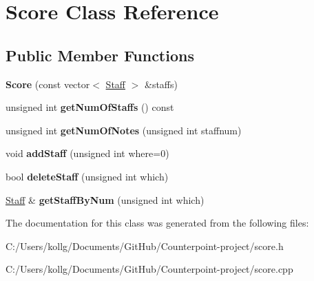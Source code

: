 \hypertarget{class_score}{}\section{Score Class Reference}
\label{class_score}
\subsection*{Public Member Functions}
\begin{DoxyCompactItemize}
\item 
\hypertarget{class_score_ac56f72ee31f68529c690f722676b3845}{}{\bfseries Score} (const vector$<$ \hyperlink{class_staff}{Staff} $>$ \&staffs)\label{class_score_ac56f72ee31f68529c690f722676b3845}

\item 
\hypertarget{class_score_a43cf7511f3556f766fbfa44d083d6ff8}{}unsigned int {\bfseries get\+Num\+Of\+Staffs} () const \label{class_score_a43cf7511f3556f766fbfa44d083d6ff8}

\item 
\hypertarget{class_score_ab638c4f5b4d3ce33a170e9b4c0c378a6}{}unsigned int {\bfseries get\+Num\+Of\+Notes} (unsigned int staffnum)\label{class_score_ab638c4f5b4d3ce33a170e9b4c0c378a6}

\item 
\hypertarget{class_score_af345ed9d25768384695cbd8689d77955}{}void {\bfseries add\+Staff} (unsigned int where=0)\label{class_score_af345ed9d25768384695cbd8689d77955}

\item 
\hypertarget{class_score_a7db1897d68ccd5a51cb74374d0a8beb3}{}bool {\bfseries delete\+Staff} (unsigned int which)\label{class_score_a7db1897d68ccd5a51cb74374d0a8beb3}

\item 
\hypertarget{class_score_a9466b1c9802a429f9731ee1a332894b3}{}\hyperlink{class_staff}{Staff} \& {\bfseries get\+Staff\+By\+Num} (unsigned int which)\label{class_score_a9466b1c9802a429f9731ee1a332894b3}

\end{DoxyCompactItemize}


The documentation for this class was generated from the following files\+:\begin{DoxyCompactItemize}
\item 
C\+:/\+Users/kollg/\+Documents/\+Git\+Hub/\+Counterpoint-\/project/score.\+h\item 
C\+:/\+Users/kollg/\+Documents/\+Git\+Hub/\+Counterpoint-\/project/score.\+cpp\end{DoxyCompactItemize}
